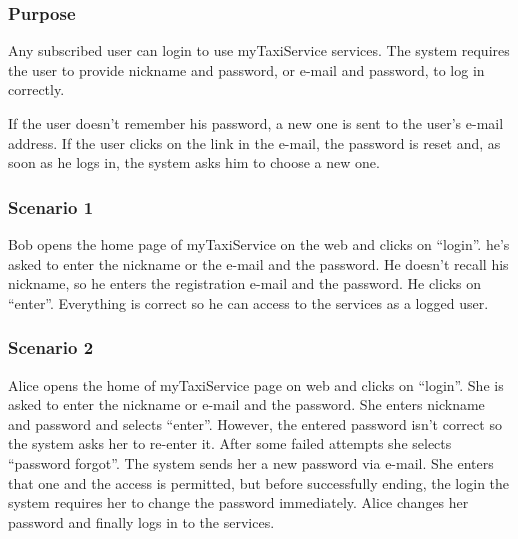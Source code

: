 \label{user-login}
\subsubsection{Purpose}
Any subscribed user can login to use myTaxiService services.
The system requires the user to provide nickname and password, or e-mail and password, to log in correctly.

If the user doesn't remember his password, a new one is sent to the user's e-mail address. If the user clicks on the link in the e-mail, the password is reset and, as soon as he logs in, the system asks him to choose a new one.



\subsubsection{Scenario 1}
Bob opens the home page of myTaxiService on the web and clicks on ``login''.
he's asked to enter the nickname or the e-mail and the password. He doesn't recall his nickname, so he enters the registration e-mail and the password. He clicks on ``enter''.
Everything is correct so he can access to the services as a logged user.

\subsubsection{Scenario 2}
Alice opens the home of myTaxiService page on web and clicks on ``login''.
She is asked to enter the nickname or e-mail and the password.
She enters nickname and password and selects ``enter''. However, the entered password isn't correct so the system asks her to re-enter it.
After some failed attempts she selects ``password forgot''.
The system sends her a new password via e-mail. She enters that one and the access is permitted, but before successfully ending, the login the system requires her to change the password immediately.
Alice changes her password and finally logs in to the services.

